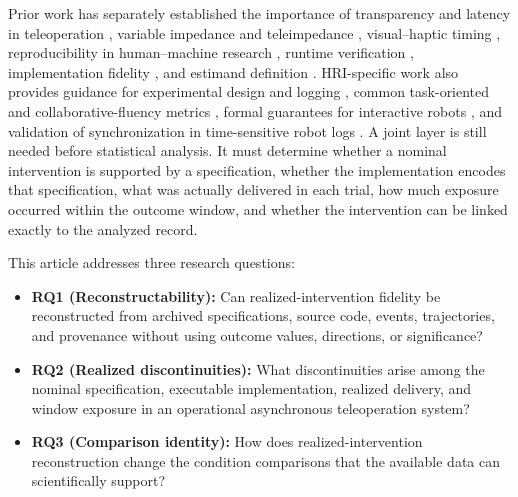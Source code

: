 \documentclass[journal]{IEEEtran}
\begin{document}
Prior work has separately established the importance of transparency and
latency in teleoperation \cite{hannaford1989,lawrence1993,hokayem2006,passenberg2010,huang2019,rakita2020,louca2024,gong2024},
variable impedance and teleimpedance
\cite{hogan1985,walker2010,buchli2011,ajoudani2012,peternel2018,abudakka2018,abudakka2020,michel2021,peternel2023,michel2023,huang2021,siegemund2024},
visual--haptic timing \cite{vogels2004}, reproducibility in human--machine
research \cite{bonsignorio2015,bonsignorio2017,gunes2022,aldana2023,bagchi2023,marchesi2024},
runtime verification \cite{huang2014}, implementation fidelity
\cite{carroll2007}, and estimand definition \cite{lundberg2021}. HRI-specific
work also provides guidance for experimental design and logging
\cite{hoffmanZhao2020}, common task-oriented and collaborative-fluency metrics
\cite{steinfeld2006,hoffman2019}, formal guarantees for interactive robots
\cite{kressGazit2021}, and validation of synchronization in time-sensitive
robot logs \cite{vigni2024}. A joint layer is still needed before statistical
analysis. It must determine whether
a nominal intervention is supported by a specification, whether the
implementation encodes that specification, what was actually delivered in
each trial, how much exposure occurred within the outcome window, and whether
the intervention can be linked exactly to the analyzed record.

This article addresses three research questions:
\begin{itemize}
    \item \textbf{RQ1 (Reconstructability):} Can realized-intervention
    fidelity be reconstructed from archived specifications, source code,
    events, trajectories, and provenance without using outcome values,
    directions, or significance?
    \item \textbf{RQ2 (Realized discontinuities):} What discontinuities arise
    among the nominal specification, executable implementation, realized
    delivery, and window exposure in an operational asynchronous teleoperation
    system?
    \item \textbf{RQ3 (Comparison identity):} How does realized-intervention
    reconstruction change the condition comparisons that the available data
    can scientifically support?
\end{itemize}
\end{document}
